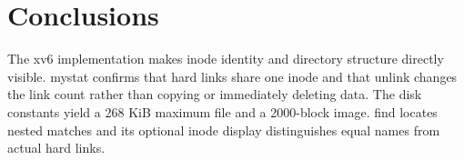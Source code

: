 \chapter{Conclusions}

The xv6 implementation makes inode identity and directory structure directly visible. mystat confirms that hard links share one inode and that unlink changes the link count rather than copying or immediately deleting data. The disk constants yield a 268 KiB maximum file and a 2000-block image. find locates nested matches and its optional inode display distinguishes equal names from actual hard links.
